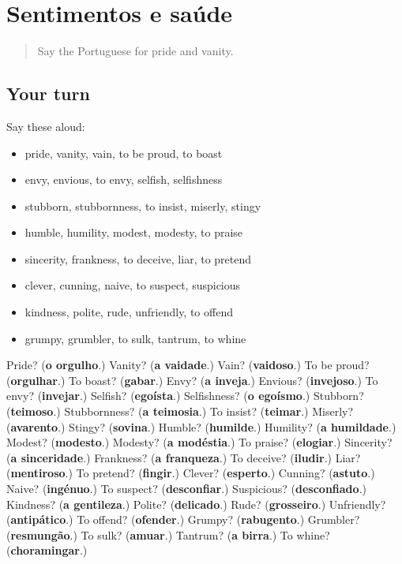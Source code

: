 \section[(dialogue)]{Sentimentos e saúde}

\label{lesson:PT-R474-revisao-467-474}



\begin{quote}
Say the Portuguese for pride and vanity.
\end{quote}

\subsection*{Your turn}
Say these aloud:

\begin{itemize}
\raggedright
  \item pride, vanity, vain, to be proud, to boast
  \item envy, envious, to envy, selfish, selfishness
  \item stubborn, stubbornness, to insist, miserly, stingy
  \item humble, humility, modest, modesty, to praise
  \item sincerity, frankness, to deceive, liar, to pretend
  \item clever, cunning, naive, to suspect, suspicious
  \item kindness, polite, rude, unfriendly, to offend
  \item grumpy, grumbler, to sulk, tantrum, to whine
\end{itemize}

\begin{tcolorbox}[breakable,colback=teal!4,colframe=teal!35!black,title={Before you move on}]
Pride? (\textbf{o orgulho}.) Vanity? (\textbf{a vaidade}.) Vain? (\textbf{vaidoso}.) To be proud? (\textbf{orgulhar}.) To boast? (\textbf{gabar}.) Envy? (\textbf{a inveja}.) Envious? (\textbf{invejoso}.) To envy? (\textbf{invejar}.) Selfish? (\textbf{egoísta}.) Selfishness? (\textbf{o egoísmo}.) Stubborn? (\textbf{teimoso}.) Stubbornness? (\textbf{a teimosia}.) To insist? (\textbf{teimar}.) Miserly? (\textbf{avarento}.) Stingy? (\textbf{sovina}.) Humble? (\textbf{humilde}.) Humility? (\textbf{a humildade}.) Modest? (\textbf{modesto}.) Modesty? (\textbf{a modéstia}.) To praise? (\textbf{elogiar}.) Sincerity? (\textbf{a sinceridade}.) Frankness? (\textbf{a franqueza}.) To deceive? (\textbf{iludir}.) Liar? (\textbf{mentiroso}.) To pretend? (\textbf{fingir}.) Clever? (\textbf{esperto}.) Cunning? (\textbf{astuto}.) Naive? (\textbf{ingénuo}.) To suspect? (\textbf{desconfiar}.) Suspicious? (\textbf{desconfiado}.) Kindness? (\textbf{a gentileza}.) Polite? (\textbf{delicado}.) Rude? (\textbf{grosseiro}.) Unfriendly? (\textbf{antipático}.) To offend? (\textbf{ofender}.) Grumpy? (\textbf{rabugento}.) Grumbler? (\textbf{resmungão}.) To sulk? (\textbf{amuar}.) Tantrum? (\textbf{a birra}.) To whine? (\textbf{choramingar}.)
\end{tcolorbox}
